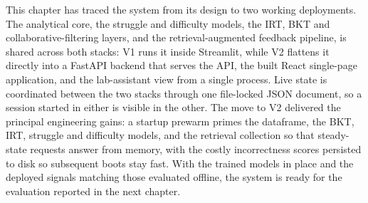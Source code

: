 This chapter has traced the system from its design to two working deployments. The analytical core, the struggle and difficulty models, the IRT, BKT and collaborative-filtering layers, and the retrieval-augmented feedback pipeline, is shared across both stacks: V1 runs it inside Streamlit, while V2 flattens it directly into a FastAPI backend that serves the API, the built React single-page application, and the lab-assistant view from a single process. Live state is coordinated between the two stacks through one file-locked JSON document, so a session started in either is visible in the other. The move to V2 delivered the principal engineering gains: a startup prewarm primes the dataframe, the BKT, IRT, struggle and difficulty models, and the retrieval collection so that steady-state requests answer from memory, with the costly incorrectness scores persisted to disk so subsequent boots stay fast. With the trained models in place and the deployed signals matching those evaluated offline, the system is ready for the evaluation reported in the next chapter.




